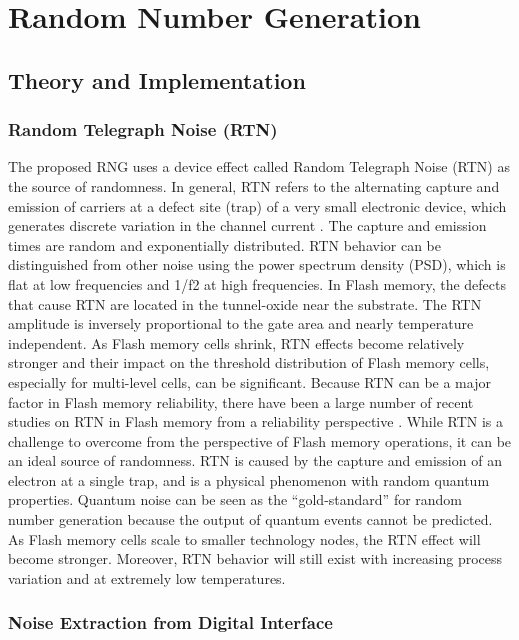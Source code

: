 \chapter{Random Number Generation} \label{sec:rng}

\section{Theory and Implementation}

\subsection{Random Telegraph Noise (RTN)}

The proposed RNG uses a device effect called Random Telegraph Noise (RTN) as the source of randomness. In general, RTN refers to the alternating capture and emission of carriers at a defect site (trap) of a very small electronic device, which generates discrete variation in the channel current \cite{kirton1989noise}. The capture and emission times are random and exponentially distributed. RTN behavior can be distinguished from other noise using the power spectrum density (PSD), which is flat at low frequencies and 1/f2 at high frequencies. In Flash memory, the defects that cause RTN are located in the tunnel-oxide near the substrate. The RTN amplitude is inversely proportional to the gate area and nearly temperature independent. As Flash memory cells shrink, RTN effects become relatively stronger and their impact on the threshold distribution of Flash memory cells, especially for multi-level cells, can be significant. Because RTN can be a major factor in Flash memory reliability, there have been a large number of recent studies on RTN in Flash memory from a reliability perspective \cite{kurata2007random, compagnoni2009random, joe2011threshold}.
While RTN is a challenge to overcome from the perspective of Flash memory operations, it can be an ideal source of randomness. RTN is caused by the capture and emission of an electron at a single trap, and is a physical phenomenon with random quantum properties. Quantum noise can be seen as the “gold-standard” for random number generation because the output of quantum events cannot be predicted. As Flash memory cells scale to smaller technology nodes, the RTN effect will become stronger. Moreover, RTN behavior will still exist with increasing process variation and at extremely low temperatures. 

\subsection{Noise Extraction from Digital Interface}


